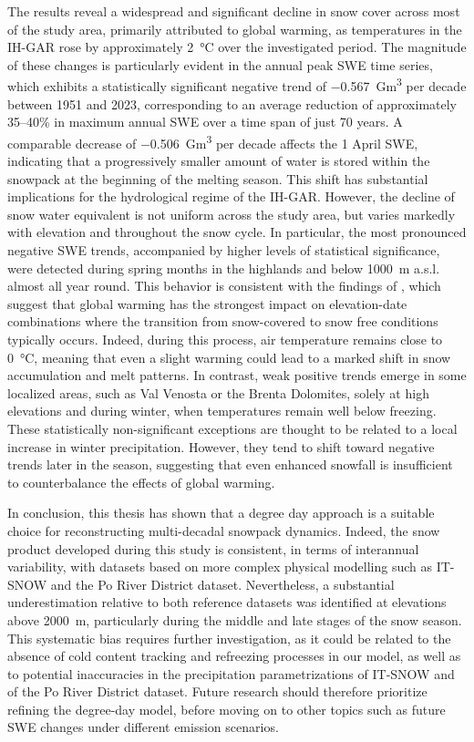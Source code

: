 \documentclass[12pt, a4paper]{article}
\begin{document}
The results reveal a widespread and significant decline in snow cover across most of the study area, primarily attributed to global warming, as 
temperatures in the IH-GAR rose by approximately \SI{2}{\degreeCelsius} over the investigated period. The magnitude of these changes is particularly 
evident in the annual peak SWE time series, which exhibits a statistically significant negative trend of \SI{-0.567}{\giga\meter\cubed} per decade 
between 1951 and 2023, corresponding to an average reduction of approximately 35--40\% in maximum annual SWE over a time span of just 70 years. A 
comparable decrease of \SI{-0.506}{\giga\meter\cubed} per decade affects the 1 April SWE, indicating that a progressively smaller amount of water 
is stored within the snowpack at the beginning of the melting season. This shift has substantial implications for the hydrological regime of the 
IH-GAR. However, the decline of snow water equivalent is not uniform across the study area, but varies markedly with elevation and throughout the 
snow cycle. In particular, the most pronounced negative SWE trends, accompanied by higher levels of statistical significance, were detected during 
spring months in the highlands and below \SI{1000}{\meter} a.s.l. almost all year round. This behavior is consistent with the findings of \textcite{Matiu_HS}, 
which suggest that global warming has the strongest impact on elevation-date combinations where the transition from snow-covered to snow free 
conditions typically occurs. Indeed, during this process, air temperature remains close to \SI{0}{\degreeCelsius}, meaning that even a slight 
warming could lead to a marked shift in snow accumulation and melt patterns. In contrast, weak positive trends emerge in some localized areas, 
such as Val Venosta or the Brenta Dolomites, solely at high elevations and during winter, when temperatures remain well below freezing. These 
statistically non-significant exceptions are thought to be related to a local increase in winter precipitation. However, they tend to shift toward 
negative trends later in the season, suggesting that even enhanced snowfall is insufficient to counterbalance the effects of global warming. 

In conclusion, this thesis has shown that a degree day approach is a suitable choice for reconstructing multi-decadal snowpack dynamics. Indeed, the snow 
product developed during this study is consistent, in terms of interannual variability, with datasets based on more complex physical modelling such as 
IT-SNOW and the Po River District dataset. Nevertheless, a substantial underestimation relative to both reference datasets was identified at elevations 
above \SI{2000}{\meter}, particularly during the middle and late stages of the snow season. This systematic bias requires further investigation, as it 
could be related to the absence of cold content tracking and refreezing processes in our model, as well as to potential inaccuracies in the precipitation 
parametrizations of IT-SNOW and of the Po River District dataset. Future research should therefore prioritize refining the degree-day model, before 
moving on to other topics such as future SWE changes under different emission scenarios.
\printbibliography
\end{document}
